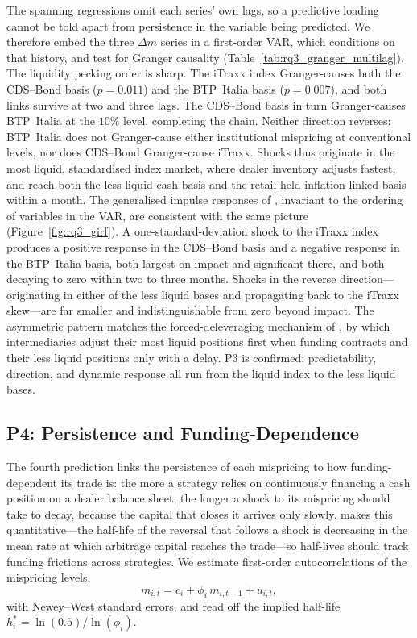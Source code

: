 The spanning regressions omit each series' own lags, so a predictive
loading cannot be told apart from persistence in the variable being
predicted. We therefore embed the three $\Delta m$ series in a
first-order VAR, which conditions on that history, and test for Granger
causality (Table~\ref{tab:rq3_granger_multilag}). The liquidity pecking
order is sharp. The iTraxx index Granger-causes both the CDS--Bond basis
($p=0.011$) and the BTP~Italia basis ($p=0.007$), and both links
survive at two and three lags. The CDS--Bond basis in turn
Granger-causes BTP~Italia at the $10\%$ level, completing the chain.
Neither direction reverses: BTP~Italia does not Granger-cause either
institutional mispricing at conventional levels, nor does CDS--Bond
Granger-cause iTraxx. Shocks thus originate in the most liquid,
standardised index market, where dealer inventory adjusts fastest, and reach both
the less liquid cash basis and the retail-held inflation-linked basis
within a month. The generalised impulse responses of \citet{pesaran1998generalized},
invariant to the ordering of variables in the VAR, are consistent
with the same picture (Figure~\ref{fig:rq3_girf}). A
one-standard-deviation shock to the iTraxx index produces a positive
response in the CDS--Bond basis and a negative response in the
BTP~Italia basis, both largest on impact and significant there, and
both decaying to zero within two to three months. Shocks in the reverse
direction---originating in either of the less liquid bases and propagating back
to the iTraxx skew---are far smaller and indistinguishable from zero
beyond impact. The asymmetric pattern matches the forced-deleveraging
mechanism of \citet{mitchell2012arbitrage}, by which intermediaries
adjust their most liquid positions first when funding contracts and
their less liquid positions only with a delay.
P3 is confirmed: predictability, direction, and dynamic response all run
from the liquid index to the less liquid bases.


\subsection{P4: Persistence and Funding-Dependence}
\label{sec:rq3_p4}

The fourth prediction links the persistence of each mispricing to how
funding-dependent its trade is: the more a strategy relies on
continuously financing a cash position on a dealer balance sheet, the
longer a shock to its mispricing should take to decay, because the
capital that closes it arrives only slowly. \citet{duffie2010presidential}
makes this quantitative---the half-life of the reversal that follows a
shock is decreasing in the mean rate at which arbitrage capital reaches
the trade---so half-lives should track funding frictions across
strategies. We estimate first-order
autocorrelations of the mispricing levels,
\begin{equation}\label{eq:ar1}
  m_{i,t} = c_i + \phi_i\,m_{i,t-1} + u_{i,t},
\end{equation}
with Newey--West standard errors, and read off the
implied half-life $h_i^{*} = \ln(0.5)/\ln(\phi_i)$.

